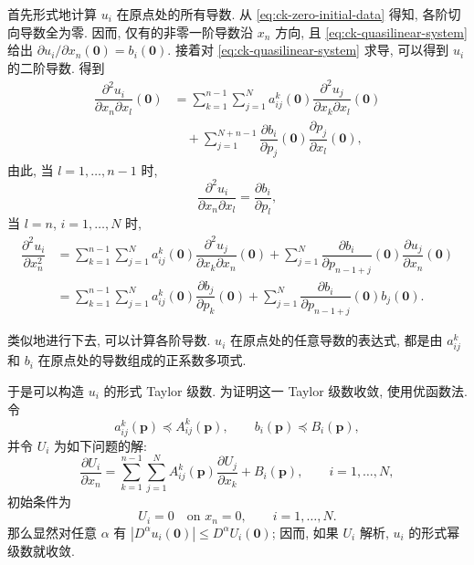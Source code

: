 \begin{Proof}首先形式地计算 $u_i$ 在原点处的所有导数. 从 \eqref{eq:ck-zero-initial-data} 得知, 各阶切向导数全为零. 因而, 仅有的非零一阶导数沿 $x_n$ 方向, 且 \eqref{eq:ck-quasilinear-system} 给出 $\partial u_i/\partial x_n(\bm{0})=b_i(\bm{0})$. 接着对 \eqref{eq:ck-quasilinear-system} 求导, 可以得到 $u_i$ 的二阶导数. 得到
\begin{equation}\label{eq:ck-second-derivative-recurrence}
\begin{aligned}
\dfrac{\partial^2u_i}{\partial x_n\partial x_l}(\bm{0})
&=\sum_{k=1}^{n-1}\sum_{j=1}^Na_{ij}^k(\bm{0})\dfrac{\partial^2u_j}{\partial x_k\partial x_l}(\bm{0})\\
&\quad+\sum_{j=1}^{N+n-1}\dfrac{\partial b_i}{\partial p_j}(\bm{0})\dfrac{\partial p_j}{\partial x_l}(\bm{0}),
\end{aligned}
\end{equation}
由此, 当 $l=1,\ldots,n-1$ 时,
\begin{equation}\label{eq:ck-tangential-second-derivatives}
\dfrac{\partial^2u_i}{\partial x_n\partial x_l}=\dfrac{\partial b_i}{\partial p_l},
\end{equation}
当 $l=n$, $i=1,\ldots,N$ 时,
\begin{equation}\label{eq:ck-second-normal-derivative}
\begin{aligned}
\dfrac{\partial^2u_i}{\partial x_n^2}
&=\sum_{k=1}^{n-1}\sum_{j=1}^Na_{ij}^k(\bm{0})\dfrac{\partial^2u_j}{\partial x_k\partial x_n}(\bm{0})
+\sum_{j=1}^N\dfrac{\partial b_i}{\partial p_{n-1+j}}(\bm{0})\dfrac{\partial u_j}{\partial x_n}(\bm{0})\\
&=\sum_{k=1}^{n-1}\sum_{j=1}^Na_{ij}^k(\bm{0})\dfrac{\partial b_j}{\partial p_k}(\bm{0})
+\sum_{j=1}^N\dfrac{\partial b_i}{\partial p_{n-1+j}}(\bm{0})b_j(\bm{0}).
\end{aligned}
\end{equation}


类似地进行下去, 可以计算各阶导数. $u_i$ 在原点处的任意导数的表达式, 都是由 $a_{ij}^k$ 和 $b_i$ 在原点处的导数组成的正系数多项式.

于是可以构造 $u_i$ 的形式 Taylor 级数. 为证明这一 Taylor 级数收敛, 使用优函数法. 令
\begin{equation}\label{eq:ck-coefficient-majorants}
a_{ij}^k(\bm{p})\preceq A_{ij}^k(\bm{p}),\qquad b_i(\bm{p})\preceq B_i(\bm{p}),
\end{equation}
并令 $U_i$ 为如下问题的解:
\begin{equation}\label{eq:ck-majorant-system}
\dfrac{\partial U_i}{\partial x_n}=\sum_{k=1}^{n-1}\sum_{j=1}^NA_{ij}^k(\bm{p})\dfrac{\partial U_j}{\partial x_k}+B_i(\bm{p}),\qquad i=1,\ldots,N,
\end{equation}
初始条件为
\begin{equation}\label{eq:ck-majorant-zero-data}
U_i=0\quad\text{on }x_n=0,\qquad i=1,\ldots,N.
\end{equation}
那么显然对任意 $\alpha$ 有 $|D^\alpha u_i(\bm{0})|\leq D^\alpha U_i(\bm{0})$; 因而, 如果 $U_i$ 解析, $u_i$ 的形式幂级数就收敛.


\end{Proof}
